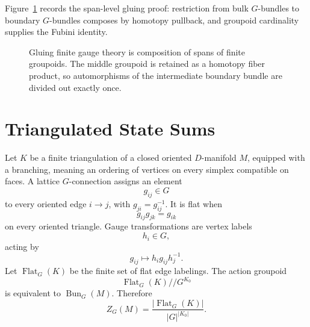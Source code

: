 Figure~\ref{fig:finite-gauge-gluing-span} records the span-level gluing proof:
restriction from bulk \(G\)-bundles to boundary \(G\)-bundles composes by
homotopy pullback, and groupoid cardinality supplies the Fubini identity.

\begin{figure}[H]
\centering
{}
\caption{Gluing finite gauge theory is composition of spans of finite
groupoids.  The middle groupoid is retained as a homotopy fiber product, so
automorphisms of the intermediate boundary bundle are divided out exactly
once.}
\label{fig:finite-gauge-gluing-span}
\end{figure}

\section{Triangulated State Sums}

Let \(K\) be a finite triangulation of a closed oriented \(D\)-manifold
\(M\), equipped with a branching, meaning an ordering of vertices on every
simplex compatible on faces.  A lattice \(G\)-connection assigns an element
\[
  g_{ij}\in G
\]
to every oriented edge \(i\to j\), with \(g_{ji}=g_{ij}^{-1}\).  It is flat
when
\begin{equation}
  g_{ij}g_{jk}=g_{ik}
  \label{eq:finite-gauge-flatness}
\end{equation}
on every oriented triangle.  Gauge transformations are vertex labels
\[
  h_i\in G,
\]
acting by
\begin{equation}
  g_{ij}\longmapsto h_i g_{ij}h_j^{-1}.
  \label{eq:finite-gauge-lattice-gauge-transformation}
\end{equation}
Let \(\operatorname{Flat}_G(K)\) be the finite set of flat edge labelings.
The action groupoid
\[
  \operatorname{Flat}_G(K)//G^{K_0}
\]
is equivalent to \(\operatorname{Bun}_G(M)\).  Therefore
\begin{equation}
  Z_G(M)
  =
  \frac{|\operatorname{Flat}_G(K)|}{|G|^{|K_0|}}.
  \label{eq:finite-gauge-lattice-state-sum}
\end{equation}

